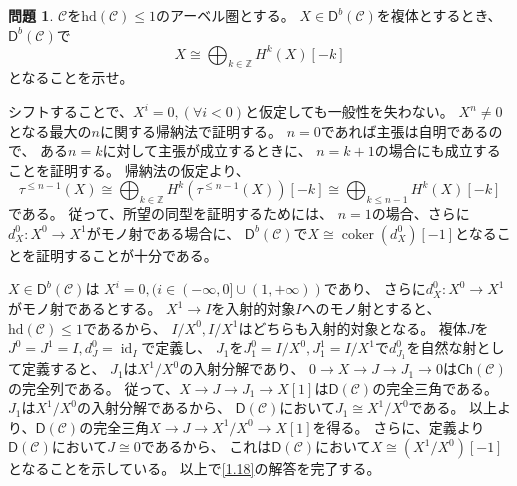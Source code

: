 \documentclass[uplatex,dvipdfmx]{jsarticle}
\makeatletter
\theoremstyle{definition}
\newtheorem{prob}[prob]{問題}
\renewenvironment{proof}[1][\proofname]{
  \pushQED{\qed}%
  \normalfont \topsep6\p@\@plus6\p@\relax
  \trivlist
  \item[\hskip\labelsep
    #1\@addpunct{\textbf{.}}]\ignorespaces
}{%
  \popQED\endtrivlist\@endpefalse
}
\providecommand{\proofname}{証明}
\DeclareMathOperator{\id}{\mathrm{id}}
\newcommand{\hd}{\mathrm{hd}}
\DeclareMathOperator{\coker}{\mathrm{coker}}
\newcommand{\Ch}{\mathsf{Ch}}
\newcommand{\sfD}{\mathsf{D}}
\newcommand\Z{\mathbb{Z}}
\newcommand\mcC{\mathcal{C}}
\makeatother
\begin{document}
\begin{prob}\label{1.18}
  \(\mcC\)を\(\hd(\mcC) \leq 1\)のアーベル圏とする。
  \(X\in \sfD^b(\mcC)\)を複体とするとき、
  \(\sfD^b(\mcC)\)で
  \[
  X\cong \bigoplus_{k\in \Z}H^k(X)[-k]
  \]
  となることを示せ。
\end{prob}

\begin{proof}
  シフトすることで、\(X^i = 0 ,(\forall i < 0)\)と仮定しても一般性を失わない。
  \(X^n \neq 0\)となる最大の\(n\)に関する帰納法で証明する。
  \(n=0\)であれば主張は自明であるので、
  ある\(n=k\)に対して主張が成立するときに、
  \(n=k+1\)の場合にも成立することを証明する。
  帰納法の仮定より、
  \[
  \tau^{\leq n-1}(X)\cong \bigoplus_{k\in \Z}H^k(\tau^{\leq n-1}(X))[-k]
  \cong \bigoplus_{k\leq n-1}H^k(X)[-k]
  \]
  である。
  従って、所望の同型を証明するためには、
  \(n=1\)の場合、さらに\(d_X^0:X^0\to X^1\)がモノ射である場合に、
  \(\sfD^b(\mcC)\)で\(X\cong \coker(d_X^0)[-1]\)となることを証明することが十分である。

  \(X\in \sfD^b(\mcC)\)は
  \(X^i = 0, (i\in (-\infty,0]\cup (1,+\infty))\)であり、
  さらに\(d_X^0:X^0\to X^1\)がモノ射であるとする。
  \(X^1\to I\)を入射的対象\(I\)へのモノ射とすると、
  \(\hd(\mcC)\leq 1\)であるから、
  \(I/X^0,I/X^1\)はどちらも入射的対象となる。
  複体\(J\)を\(J^0=J^1=I, d_J^0 = \id_I\)で定義し、
  \(J_1\)を\(J_1^0=I/X^0,J_1^1=I/X^1\)で\(d_{J_1}^0\)を自然な射として定義すると、
  \(J_1\)は\(X^1/X^0\)の入射分解であり、
  \(0\to X \to J \to J_1 \to 0\)は\(\Ch(\mcC)\)の完全列である。
  従って、\(X\to J\to J_1\to X[1]\)は\(\sfD(\mcC)\)の完全三角である。
  \(J_1\)は\(X^1/X^0\)の入射分解であるから、
  \(\sfD(\mcC)\)において\(J_1\cong X^1/X^0\)である。
  以上より、\(\sfD(\mcC)\)の完全三角\(X\to J \to X^1/X^0\to X[1]\)を得る。
  さらに、定義より\(\sfD(\mcC)\)において\(J\cong 0\)であるから、
  これは\(\sfD(\mcC)\)において\(X\cong (X^1/X^0)[-1]\)となることを示している。
  以上で\autoref{1.18}の解答を完了する。
\end{proof}
\end{document}
